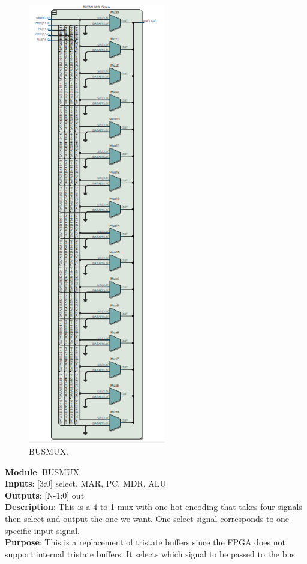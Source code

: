 \documentclass[12pt]{article}
\begin{document}
\begin{figure}[H]
    \centering
    \includegraphics[width=6cm]{busmux.png}
    \caption{BUSMUX.}
\end{figure}
\textbf{Module}: BUSMUX \\ 
\textbf{Inputs}: [3:0] select, MAR, PC, MDR, ALU\\ 
\textbf{Outputs}: [N-1:0] out\\ 
\textbf{Description}: This is a 4-to-1 mux with one-hot encoding that takes four signals then select and output the one we want. One select signal corresponds to one specific input signal. \\ 
\textbf{Purpose}: This is a replacement of tristate buffers since the FPGA does not support internal tristate buffers. It selects which signal to be passed to the bus. \\
\end{document}

